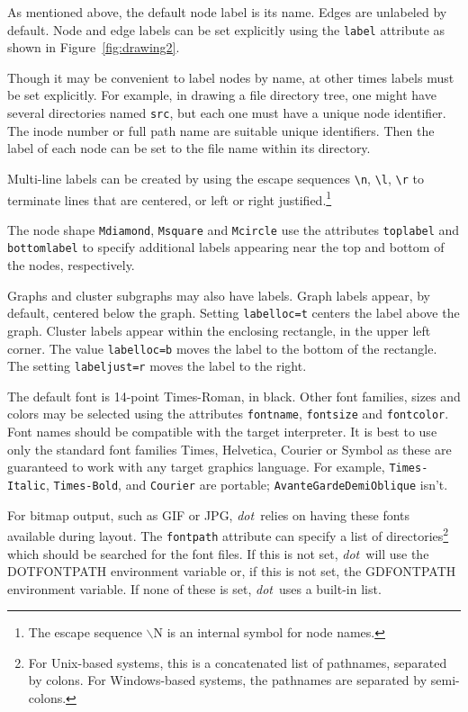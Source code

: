 \documentclass[11pt]{article}
\def\dot{{\it dot}}
\begin{document}
As mentioned above, the default node label is its name.
Edges are unlabeled by default.
Node and edge labels can be set explicitly using the {\tt label}
attribute as shown in 
Figure~\ref{fig:drawing2}.

Though it may be convenient to label nodes by name, at other times
labels must be set explicitly.  For example, in drawing a file
directory tree, one might have several directories named {\tt src},
but each one must have a unique node identifier.
The inode number or full path name are suitable unique identifiers.
Then the label of each node can be set to the file name within
its directory. 

Multi-line labels can be created by using the escape 
sequences \verb"\n", \verb"\l", \verb"\r" to terminate
lines that are centered, or left or right justified.\footnote{The escape
sequence $\backslash$N is an internal symbol for node names.}

The node shape {\tt Mdiamond}, {\tt Msquare} and {\tt Mcircle}
use the attributes {\tt toplabel} and {\tt bottomlabel} to specify 
additional labels appearing near the top and bottom of the nodes,
respectively.

Graphs and cluster subgraphs may also have labels. Graph labels
appear, by default, centered below the graph. Setting {\tt labelloc=t}
centers the label above the graph. Cluster labels appear within the
enclosing rectangle, in the upper left corner. The value {\tt labelloc=b}
moves the label to the bottom of the rectangle. The setting
{\tt labeljust=r} moves the label to the right.

The default font is 14-point Times-Roman, in black.
Other font families, sizes and colors may be selected using the
attributes {\tt fontname}, {\tt fontsize} and {\tt fontcolor}.
Font names should be compatible with the target interpreter.
It is best to use only the standard font families
Times, Helvetica, Courier or Symbol as these are guaranteed to work
with any target graphics language.
For example, \verb"Times-Italic", \verb"Times-Bold", and \verb"Courier"
are portable; {\tt AvanteGarde\-DemiOblique} isn't.

For bitmap output, such as GIF or JPG, \dot\ relies on having these
fonts available during layout. The {\tt fontpath} attribute can
specify a list of directories\footnote{For Unix-based systems, this is
a concatenated list of pathnames, separated by colons. For Windows-based
systems, the pathnames are separated by semi-colons.} which should be 
searched for the font files. If this is not set, 
\dot\ will use the DOTFONTPATH environment variable or, if this is not
set, the GDFONTPATH environment variable. If none of these is set, \dot\
uses a built-in list.
\end{document}
